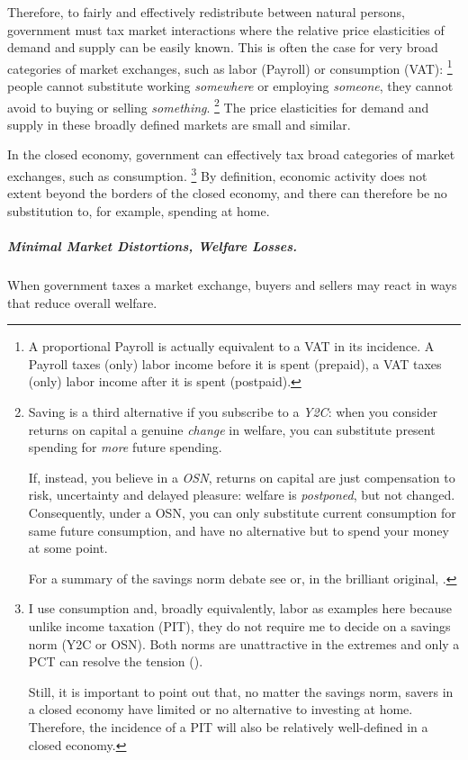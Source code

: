 Therefore, to fairly and effectively redistribute between natural persons, government must tax market interactions where the relative price elasticities of demand and supply can be easily known.
This is often the case for very broad categories of market exchanges, such as labor (\gls{Payroll}) or consumption (\gls{VAT}):
\footnote{
	A proportional \gls{Payroll} is actually equivalent to a \gls{VAT} in its incidence.
	A \gls{Payroll} taxes (only) labor income before it is spent (prepaid), a \gls{VAT} taxes (only) labor income after it is spent (postpaid).
}
people cannot substitute working \emph{somewhere} or employing \emph{someone}, they cannot avoid to buying or selling \emph{something}.
\footnote{
	Saving is a third alternative if you subscribe to a \emph{\gls{Y2C}}:
	when you consider returns on capital a genuine \emph{change} in welfare, you can substitute present spending for \emph{more} future spending.

	If, instead, you believe in a \emph{\gls{OSN}}, returns on capital are just compensation to risk, uncertainty and delayed pleasure:
	welfare is \emph{postponed}, but not changed.
	Consequently, under a \gls{OSN}, you can only substitute current consumption for same future consumption, and have no alternative but to spend your money at some point.

	For a summary of the savings norm debate see \cite{Held2010a} or, in the brilliant original, \cite[819]{McCaffery2005}.
}
The price elasticities for demand and supply in these broadly defined markets are small and similar.

In the closed economy, government can effectively tax broad categories of market exchanges, such as consumption.
\footnote{
	I use consumption and, broadly equivalently, labor as examples here because unlike income taxation (\gls{PIT}), they do not require me to decide on a savings norm (\gls{Y2C} or \gls{OSN}).
	Both norms are unattractive in the extremes and only a \gls{PCT} can resolve the tension (\citealt{Held2010a}).

	Still, it is important to point out that, no matter the savings norm, savers in a closed economy have limited or no alternative to investing at home.
	Therefore, the incidence of a \gls{PIT} will also be relatively well-defined in a closed economy.
}
By definition, economic activity does not extent beyond the borders of the closed economy, and there can therefore be no substitution to, for example, spending at home.

\subparagraph[Tax Efficiency]{Minimal Market Distortions, Welfare Losses.}  \label{sec:minimal-DWL}
When government taxes a market exchange, buyers and sellers may react in ways that reduce overall welfare.

